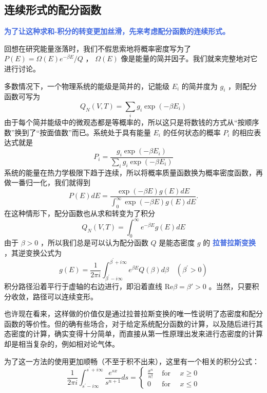 \subsection{连续形式的配分函数}
\textcolor{RoyalBlue}{\textbf{\kaishu 为了让这种求和-积分的转变更加丝滑，先来考虑配分函数的连续形式。}}

回想在研究能量涨落时，我们不假思索地将概率密度写为了 $P(E) = \Omega(E)e^{-\beta E}/Q$ ， $\Omega(E)$ 像是能量的简并因子。我们就来完整地对它进行讨论。

多数情况下，一个物理系统的能级是简并的，记能级 $E_i$ 的简并度为 $g_i$ ，则配分函数可写为
\begin{equation}
    Q_N(V, T)=\sum_i g_i \exp \left(-\beta E_i\right)
\end{equation}
由于每个简并能级中的微观态都是等概率的，所以这只是将数钱的方式从“按顺序数”换到了“按面值数”而已。系统处于具有能量 $E_i$ 的任何状态的概率 $P_i$ 的相应表达式就是
\begin{equation}
    P_i=\frac{g_i \exp \left(-\beta E_i\right)}{\displaystyle\sum_i g_i \exp \left(-\beta E_i\right)}
\end{equation}
系统的能量在热力学极限下趋于连续，所以将概率质量函数换为概率密度函数，再做一番归一化，我们就得到
\begin{equation}
    P(E) d E=\frac{\exp (-\beta E) g(E) d E}{\displaystyle\int_0^{\infty} \exp (-\beta E) g(E) d E} .
\end{equation}
在这种情形下，配分函数也从求和转变为了积分
\begin{equation}
    Q_N(V, T)=\int_0^{\infty} e^{-\beta E} g(E) d E
\end{equation}
由于 $\beta>0$ ，所以我们总是可以认为配分函数 $Q$ 是能态密度 $g$ 的 \textcolor{RoyalBlue}{\textbf{\kaishu 拉普拉斯变换}} ，其逆变换公式为
\begin{equation}
    g(E)=\frac{1}{2 \pi i} \int_{\beta^{\prime}-i \infty}^{\beta^{\prime}+i \infty} e^{\beta E} Q(\beta) d \beta \quad\left(\beta^{\prime}>0\right)
\end{equation}
积分路径沿着平行于虚轴的右边进行，即沿着直线 $\text{Re}\beta = \beta' >0$ 。当然，只要积分收敛，路径可以连续变形。

也许现在看来，这样做的价值仅是通过拉普拉斯变换的唯一性说明了态密度和配分函数的等价性。但的确有些场合，对于给定系统配分函数的计算，以及随后进行其态密度的计算，确实变得十分简单，而直接从第一性原理出发来进行态密度的计算却是相当复杂的，例如相对论气体。

为了这一方法的使用更加顺畅（不至于积不出来），这里有一个相关的积分公式：
\begin{equation}\label{equ:Laplace}
    \frac{1}{2 \pi i} \int_{s^{\prime}-i \infty}^{s^{\prime}+i \infty} \frac{e^{s x}}{s^{n+1}} d s=\left\{\begin{array}{lll}
        \frac{x^n}{n !} & \text { for } \quad x \geq 0 \\
        0 & \text { for } \quad x \leq 0
        \end{array}\right.
\end{equation}


